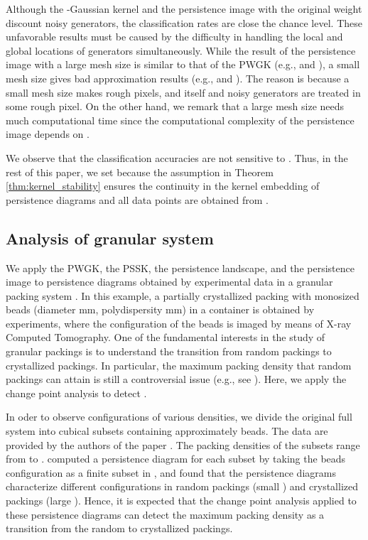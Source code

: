 \documentclass{article}
\begin{document}
Although the -Gaussian kernel and the persistence image with the original weight  discount noisy generators, the classification rates are close the chance level.
These unfavorable results must be caused by the difficulty in handling the local and global locations of generators simultaneously.
While the result of the persistence image with a large mesh size is similar to that of the PWGK (e.g.,  and ), a small mesh size gives bad approximation results (e.g.,  and ).
The reason is because a small mesh size makes rough pixels, and  itself and noisy generators are treated in some rough pixel.
On the other hand, we remark that a large mesh size  needs much computational time since the computational complexity of the persistence image depends on .  

We observe that the classification accuracies are not sensitive to . 
Thus, in the rest of this paper, we set  because the assumption  in Theorem \ref{thm:kernel_stability} ensures the continuity in the kernel embedding of persistence diagrams and all data points are obtained from .


\subsection{Analysis of granular system}
\label{subsec:granular} 

We apply the PWGK, the PSSK, the persistence landscape, and the persistence image to persistence diagrams obtained by experimental data in a granular packing system \cite{FSCS11}.
In this example, a partially crystallized packing with  monosized beads (diameter mm, polydispersity mm) in a container is obtained by experiments, where the configuration of the beads is imaged by means of X-ray Computed Tomography.
One of the fundamental interests in the study of granular packings is to understand the transition from random packings to crystallized packings.
In particular, the maximum packing density  that random packings can attain is still a controversial issue (e.g., see \cite{TTD00}).
Here, we apply the change point analysis to detect .  

In oder to observe configurations of various densities, we divide the original full system into  cubical subsets containing approximately  beads.
The data are provided by the authors of the paper \cite{FSCS11}.
The packing densities of the subsets range from  to .
\cite{STRFH17} computed a persistence diagram for each subset by taking the beads configuration as a finite subset in , and found that the persistence diagrams characterize different configurations in random packings (small ) and crystallized packings (large ).
Hence, it is expected that the change point analysis applied to these persistence diagrams can detect the maximum packing density  as a transition from the random to crystallized packings. 
\end{document}
